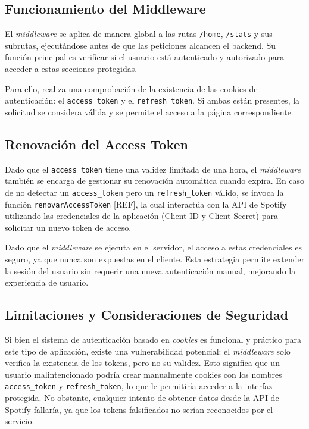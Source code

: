 \subsection{Funcionamiento del Middleware}

El \textit{middleware} se aplica de manera global a las rutas \texttt{/home}, \texttt{/stats} y sus subrutas, ejecutándose antes de que las peticiones alcancen el backend. Su función principal es verificar si el usuario está autenticado y autorizado para acceder a estas secciones protegidas.

Para ello, realiza una comprobación de la existencia de las cookies de autenticación: el \texttt{access\_token} y el \texttt{refresh\_token}. Si ambas están presentes, la solicitud se considera válida y se permite el acceso a la página correspondiente.

\subsection{Renovación del Access Token}

Dado que el \texttt{access\_token} tiene una validez limitada de una hora, el \textit{middleware} también se encarga de gestionar su renovación automática cuando expira. En caso de no detectar un \texttt{access\_token} pero un \texttt{refresh\_token} válido, se invoca la función \texttt{renovarAccessToken} [REF], la cual interactúa con la API de Spotify utilizando las credenciales de la aplicación (Client ID y Client Secret) para solicitar un nuevo token de acceso.

Dado que el \textit{middleware} se ejecuta en el servidor, el acceso a estas credenciales es seguro, ya que nunca son expuestas en el cliente. Esta estrategia permite extender la sesión del usuario sin requerir una nueva autenticación manual, mejorando la experiencia de usuario.

\subsection{Limitaciones y Consideraciones de Seguridad}

Si bien el sistema de autenticación basado en \textit{cookies} es funcional y práctico para este tipo de aplicación, existe una vulnerabilidad potencial: el \textit{middleware} solo verifica la existencia de los tokens, pero no su validez. Esto significa que un usuario malintencionado podría crear manualmente cookies con los nombres \texttt{access\_token} y \texttt{refresh\_token}, lo que le permitiría acceder a la interfaz protegida. No obstante, cualquier intento de obtener datos desde la API de Spotify fallaría, ya que los tokens falsificados no serían reconocidos por el servicio.

